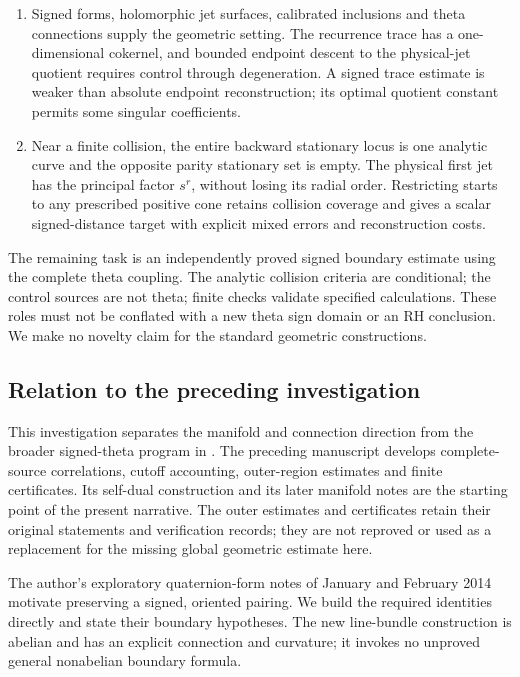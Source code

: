 \documentclass[11pt]{article}
\numberwithin{equation}{section}
\theoremstyle{definition}
\theoremstyle{remark}
\begin{document}
\begin{enumerate}[leftmargin=*,itemsep=3pt]
 endpoints. Positive-source controls show why weakened arithmetic
 hypotheses are insufficient; complete reflection fixes the input.
 \item Signed forms, holomorphic jet surfaces, calibrated inclusions
 and theta connections supply the geometric setting. The recurrence
 trace has a one-dimensional cokernel, and bounded endpoint descent to
 the physical-jet quotient requires control through degeneration. A
 signed trace estimate is weaker than absolute endpoint reconstruction;
 its optimal quotient constant permits some singular coefficients.
 \item Near a finite collision, the entire backward stationary locus is
 one analytic curve and the opposite parity stationary set is empty.
 The physical first jet has the principal factor $s^r$, without losing
 its radial order. Restricting starts to any prescribed positive cone
 retains collision coverage and gives a scalar signed-distance target
 with explicit mixed errors and reconstruction costs.
\end{enumerate}
The remaining task is an independently proved signed boundary estimate
using the complete theta coupling. The analytic collision criteria are
conditional; the control sources are not theta; finite checks validate
specified calculations. These roles must not be conflated with a new
theta sign domain or an RH conclusion. We make no novelty claim for the
standard geometric constructions.

\subsection{Relation to the preceding investigation}
This investigation separates the manifold and connection direction
from the broader signed-theta program in \cite{BakerTheta}.
The preceding manuscript develops complete-source correlations,
cutoff accounting, outer-region estimates and finite certificates.
Its self-dual construction and its later manifold notes are the starting
point of the present narrative.  The outer estimates and certificates
retain their original statements and verification records; they are not
reproved or used as a replacement for the missing global geometric
estimate here.

The author's exploratory quaternion-form notes of January and February
2014 \cite{BakerQuaternion} motivate preserving a signed, oriented
pairing.  We build the required identities directly and state their
boundary hypotheses.  The new line-bundle construction is abelian and
has an explicit connection and curvature; it invokes no unproved
general nonabelian boundary formula.
\end{document}
